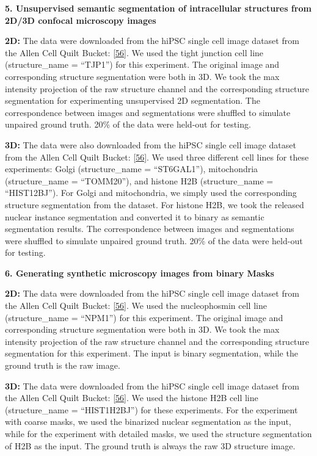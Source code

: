 \textbf{5. Unsupervised semantic segmentation of intracellular structures from 2D/3D confocal microscopy images}

\textbf{2D:} The data were downloaded from the hiPSC single cell image dataset from the Allen Cell Quilt Bucket: {[}\protect\hyperlink{ref-vm45dW9e}{56}{]}. We used the tight junction cell line (structure\_name = ``TJP1'') for this experiment. The original image and corresponding structure segmentation were both in 3D. We took the max intensity projection of the raw structure channel and the corresponding structure segmentation for experimenting unsupervised 2D segmentation. The correspondence between images and segmentations were shuffled to simulate unpaired ground truth. 20\% of the data were held-out for testing.

\textbf{3D:} The data were also downloaded from the hiPSC single cell image dataset from the Allen Cell Quilt Bucket: {[}\protect\hyperlink{ref-vm45dW9e}{56}{]}. We used three different cell lines for these experiments: Golgi (structure\_name = ``ST6GAL1''), mitochondria (structure\_name = ``TOMM20''), and histone H2B (structure\_name = ``HIST12BJ''). For Golgi and mitochondria, we simply used the corresponding structure segmentation from the dataset. For histone H2B, we took the released nuclear instance segmentation and converted it to binary as semantic segmentation results. The correspondence between images and segmentations were shuffled to simulate unpaired ground truth. 20\% of the data were held-out for testing.

\textbf{6. Generating synthetic microscopy images from binary Masks}

\textbf{2D:} The data were downloaded from the hiPSC single cell image dataset from the Allen Cell Quilt Bucket: {[}\protect\hyperlink{ref-vm45dW9e}{56}{]}. We used the nucleophosmin cell line (structure\_name = ``NPM1'') for this experiment. The original image and corresponding structure segmentation were both in 3D. We took the max intensity projection of the raw structure channel and the corresponding structure segmentation for this experiment. The input is binary segmentation, while the ground truth is the raw image.

\textbf{3D:} The data were downloaded from the hiPSC single cell image dataset from the Allen Cell Quilt Bucket: {[}\protect\hyperlink{ref-vm45dW9e}{56}{]}. We used the histone H2B cell line (structure\_name = ``HIST1H2BJ'') for these experiments. For the experiment with coarse masks, we used the binarized nuclear segmentation as the input, while for the experiment with detailed masks, we used the structure segmentation of H2B as the input. The ground truth is always the raw 3D structure image.

